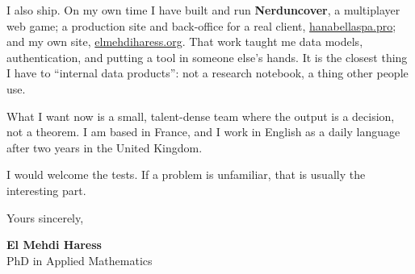 \documentclass[10pt,a4paper]{article}
\begin{document}
I also ship. On my own time I have built and run \textbf{Nerduncover}, a multiplayer web game; a production site and back-office for a real client, \href{https://hanabellaspa.pro}{hanabellaspa.pro}; and my own site, \href{https://elmehdiharess.org}{elmehdiharess.org}. That work taught me data models, authentication, and putting a tool in someone else's hands. It is the closest thing I have to ``internal data products'': not a research notebook, a thing other people use.

What I want now is a small, talent-dense team where the output is a decision, not a theorem. I am based in France, and I work in English as a daily language after two years in the United Kingdom.

I would welcome the tests. If a problem is unfamiliar, that is usually the interesting part.

Yours sincerely,

\vspace{2.4ex}

\hfill
\begin{minipage}{0.42\textwidth}
\raggedleft
{\headingfont\bfseries\small El Mehdi Haress}\\[0.2ex]
{\small\color{muted}PhD in Applied Mathematics}
\end{minipage}
\end{document}
